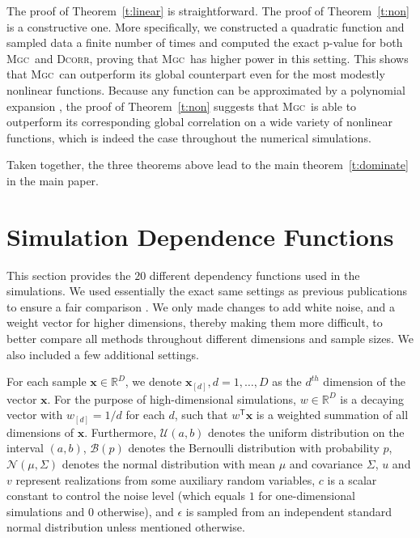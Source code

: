 \documentclass[11pt]{article}
\providecommand{\sct}[1]{{\normalfont\textsc{#1}}}
\providecommand{\mb}[1]{\boldsymbol{#1}}
\providecommand{\mc}[1]{\mathcal{#1}}
\newcommand{\Real}{\mathbb{R}}
\newcommand{\T}{^{\ensuremath{\mathsf{T}}}}           %
\newcommand{\Mgc}{\sct{Mgc}}
\newcommand{\Dcorr}{\sct{Dcorr}}
\newcommand{\mbx}{\ensuremath{\mb{x}}}
\begin{document}
The proof of Theorem~\ref{t:linear} is straightforward.  The proof of Theorem~\ref{t:non} is a constructive one. More specifically, we constructed a quadratic function and sampled data a finite number of times and computed the exact p-value for both \Mgc~and \Dcorr, proving that \Mgc~has higher power in this setting. This shows that \Mgc~can outperform its global counterpart even for the most modestly nonlinear functions.  Because any function can be approximated by a polynomial expansion \cite{RudinBook}, the proof of Theorem~\ref{t:non} suggests that \Mgc~is able to outperform its corresponding global correlation on a wide variety of nonlinear functions, which is indeed the case throughout the numerical simulations. 

Taken together, the three theorems above lead to the main theorem~\ref{t:dominate} in the main paper.

\section{Simulation Dependence Functions}
\label{appen:function}

This section provides the $20$ different dependency functions used in the simulations.  We used essentially the exact same settings as previous publications to ensure a fair comparison \cite{SzekelyRizzoBakirov2007, SimonTibshirani2012, SimonTibshirani2012, GorfineHellerHeller2012}.  We only made changes to add white noise, and a weight vector for higher dimensions, thereby making them more difficult, to better compare all methods throughout different dimensions and sample sizes. We also included a few additional settings.

For each sample $\mb{x} \in \Real^{D}$, we denote $\mb{x}_{[d]}, d=1,\ldots,D$ as the $d^{th}$ dimension of the vector \mbx. For the purpose of high-dimensional simulations, $w \in \Real^{D}$ is a decaying vector with $w_{[d]}=1/d$ for each $d$, such that $w\T \mb{x}$ is a 
weighted summation of all dimensions of \mbx. %
Furthermore, $\mc{U}(a,b)$ denotes the uniform distribution on the interval $(a,b)$, $\mc{B}(p)$ denotes the Bernoulli distribution with probability $p$, $\mc{N}(\mu,{\Sigma})$ denotes the normal distribution with mean ${\mu}$ and covariance ${\Sigma}$, 
$u$ and $v$ represent realizations from some auxiliary random variables, $c$ is a scalar constant to control the noise level (which equals $1$ for one-dimensional simulations and $0$ otherwise), and $\epsilon$ is sampled from an independent standard normal distribution unless mentioned otherwise.
\end{document}
